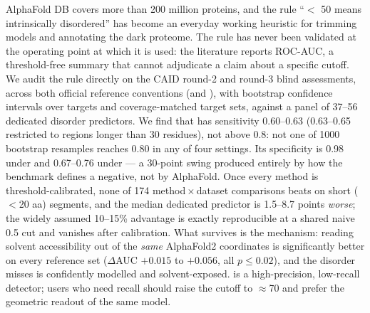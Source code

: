 AlphaFold DB covers more than 200 million proteins, and the rule ``\plddt $<$ 50 means
intrinsically disordered'' has become an everyday working heuristic for trimming models and
annotating the dark proteome. The rule has never been validated at the operating point at
which it is used: the literature reports ROC-AUC, a threshold-free summary that cannot
adjudicate a claim about a specific cutoff. We audit the rule directly on the CAID round-2 and
round-3 blind assessments, across both official reference conventions (\dpdb and \dnox), with
bootstrap confidence intervals over targets and coverage-matched target sets, against a panel
of 37--56 dedicated disorder predictors. We find that \plddtrule has sensitivity 0.60--0.63
(0.63--0.65 restricted to regions longer than 30 residues), not above 0.8: not one of 1000
bootstrap resamples reaches 0.80 in any of four settings. Its specificity is 0.98 under \dpdb
and 0.67--0.76 under \dnox --- a 30-point swing produced entirely by how the benchmark defines
a negative, not by AlphaFold. Once every method is threshold-calibrated, none of 174
method\,$\times$\,dataset comparisons beats \plddt on short ($<$20 aa) segments, and the median
dedicated predictor is 1.5--8.7 points \emph{worse}; the widely assumed 10--15\% advantage is
exactly reproducible at a shared naive 0.5 cut and vanishes after calibration. What survives is
the mechanism: reading solvent accessibility out of the \emph{same} AlphaFold2 coordinates is
significantly better on every reference set ($\Delta$AUC $+0.015$ to $+0.056$, all $p \le 0.02$),
and the disorder \plddt misses is confidently modelled and solvent-exposed.
\plddtrule is a high-precision, low-recall detector; users who need recall should raise the
cutoff to $\approx$70 and prefer the geometric readout of the same model.
